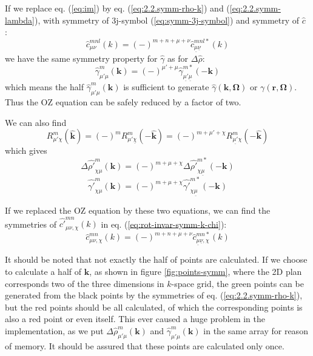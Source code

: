 If we replace eq. (\ref{eq:im}) by eq. (\ref{eq:2.2.symm-rho-k})
and (\ref{eq:2.2.symm-lambda}), with symmetry of 3j-symbol (\ref{eq:symm-3j-symbol})
and symmetry of $\hat{c}$ \citep{Blum_I}:
\begin{equation}
\hat{c}_{\mu\nu}^{mnl}(k)=\left(-\right)^{m+n+\mu+\nu}\hat{c}_{\underline{\mu}\underline{\nu}}^{mnl*}(k)
\end{equation}
we have the same symmetry property for $\hat{\gamma}$ as for $\Delta\hat{\rho}$:
\begin{equation}
\hat{\gamma}_{\mu'\mu}^{m}(\mathbf{k})=\left(-\right)^{\mu'+\mu}\hat{\gamma}_{\underline{\mu'}\underline{\mu}}^{m*}(-\mathbf{k})
\end{equation}
which means the half $\hat{\gamma}_{\mu'\mu}^{m}(\mathbf{k})$ is
sufficient to generate $\hat{\gamma}(\mathbf{k},\mathbf{\Omega})$
or $\gamma(\mathbf{r},\mathbf{\Omega})$. Thus the \acs{OZ} equation
can be safely reduced by a factor of two. 

We can also find
\begin{equation}
R_{\mu'\chi}^{m}(\hat{\mathbf{k}})=(-)^{m}R_{\mu'\underline{\chi}}^{m}(-\hat{\mathbf{k}})=(-)^{m+\mu'+\chi}R_{\underline{\mu'}\chi}^{m}(-\hat{\mathbf{k}})\label{eq:3}
\end{equation}
which gives
\begin{equation}
\Delta\hat{\rho'}_{\chi\mu}^{m}(\mathbf{k})=(-)^{m+\mu+\chi}\Delta\hat{\rho'}_{\chi\underline{\mu}}^{m*}(-\mathbf{k})
\end{equation}
\begin{equation}
\hat{\gamma'}_{\chi\mu}^{m}(\mathbf{k})=(-)^{m+\mu+\chi}\hat{\gamma'}_{\chi\underline{\mu}}^{m*}(-\mathbf{k})
\end{equation}

If we replaced the \acs{OZ} equation by these two equations, we can
find the symmetries of $\hat{c'}_{\mu\nu,\chi}^{mn}(k)$ in eq. (\ref{eq:rot-invar-symm-k-chi}):
\begin{equation}
\hat{c}_{\mu\nu,\chi}^{mn}(k)=\left(-\right)^{m+n+\mu+\nu}\hat{c}_{\underline{\mu}\underline{\nu},\chi}^{mn*}(k)
\end{equation}

It should be noted that not exactly the half of points are calculated.
If we choose to calculate a half of $\mathbf{k}$, as shown in figure
\ref{fig:points-symm}, where the 2D plan corresponds two of the three
dimensions in $k$-space grid, the green points can be generated from
the black points by the symmetries of eq. (\ref{eq:2.2.symm-rho-k}),
but the red points should be all calculated, of which the corresponding
points is also a red point or even itself. This ever caused a huge
problem in the implementation, as we put $\Delta\hat{\rho}_{\mu'\mu}^{m}(\mathbf{k})$
and $\hat{\gamma}_{\mu'\mu}^{m}(\mathbf{k})$ in the same array for
reason of memory. It should be assured that these points are calculated
only once.

